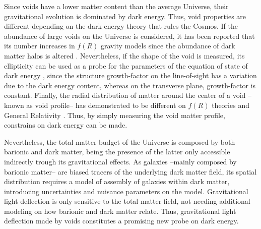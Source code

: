 Since voids have a lower matter content than the average Universe, their gravitational evolution is dominated by dark energy. Thus, void properties are different depending on the dark energy theory that rules the Cosmos. If the abundance of large voids on the Universe is considered, it has been reported that its number increases in $f(R)$ gravity models \cite{2012MNRAS.421.3481L} since the abundance of dark matter halos is altered \cite{2017JCAP...03..012V}. Nevertheless, if the shape of the void is measured, its ellipticity can be used as a probe for the parameters of the equation of state of dark energy \cite{2010MNRAS.403.1392L,0004-637X-754-2-109,PhysRevLett.98.081301,2013PhRvL.111x1103S}, since the structure growth-factor on the line-of-sight has a variation due to
the dark energy content, whereas on the transverse plane, growth-factor is constant. Finally, the radial distribution of matter around the center of a void --known as void profile-- has demonstrated to be different on $f(R)$ theories and General Relativity \cite{2014APh....54...44A,2014arXiv1410.8355C,2015MNRAS.451.4215Z,2015JCAP...08..028B,2016PhRvD..93j3522A,2016PhRvD..94j3524A}. Thus, by simply measuring the void matter profile, constrains on dark energy can be made.
\newline

Nevertheless, the total matter budget of the Universe is composed by both barionic and dark matter, being the presence of the latter only accessible indirectly trough its gravitational effects. As galaxies --mainly composed by barionic matter-- are biased tracers of the underlying dark matter field, its spatial distribution requires a model of assembly of galaxies within dark matter, introducing uncertainties and nuisance parameters on the model. Gravitational light deflection is only sensitive to the total matter field, not needing additional modeling on how barionic and dark matter relate. Thus, gravitational light deflection made by voids constitutes a promising new probe on dark energy.
